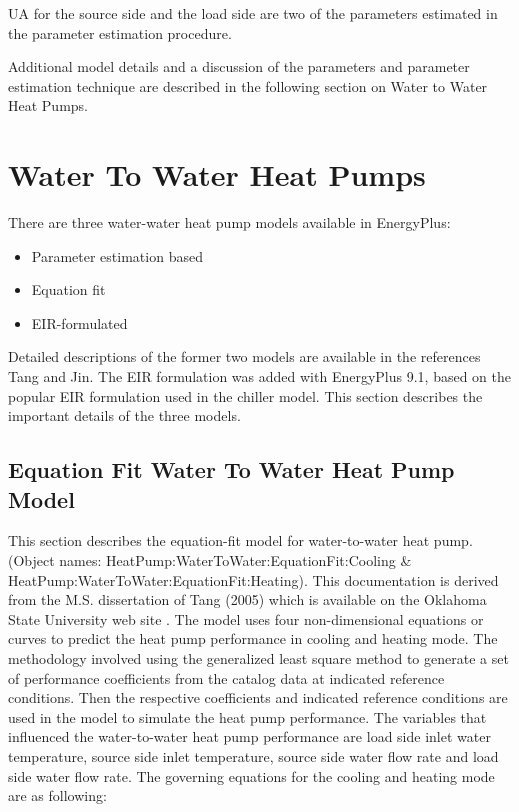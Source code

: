 UA for the source side and the load side are two of the parameters estimated in the parameter estimation procedure.

Additional model details and a discussion of the parameters and parameter estimation technique are described in the following section on Water to Water Heat Pumps.

\section{Water To Water Heat Pumps}\label{water-to-water-heat-pumps}

There are three water-water heat pump models available in EnergyPlus:

\begin{itemize}
  \item Parameter estimation based
  \item Equation fit
  \item EIR-formulated
\end{itemize}

Detailed descriptions of the former two models are available in the references Tang and Jin.  The EIR formulation was added with EnergyPlus 9.1, based on the popular EIR formulation used in the chiller model.  This section describes the important details of the three models.

\subsection{Equation Fit Water To Water Heat Pump Model}\label{equation-fit-water-to-water-heat-pump-model}

This section describes the equation-fit model for water-to-water heat pump. (Object names: HeatPump:WaterToWater:EquationFit:Cooling \& HeatPump:WaterToWater:EquationFit:Heating). This documentation is derived from the M.S. dissertation of Tang (2005) which is available on the Oklahoma State University web site . The model uses four non-dimensional equations or curves to predict the heat pump performance in cooling and heating mode. The methodology involved using the generalized least square method to generate a set of performance coefficients from the catalog data at indicated reference conditions. Then the respective coefficients and indicated reference conditions are used in the model to simulate the heat pump performance. The variables that influenced the water-to-water heat pump performance are load side inlet water temperature, source side inlet temperature, source side water flow rate and load side water flow rate. The governing equations for the cooling and heating mode are as following:

